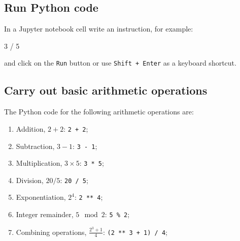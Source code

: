 \subsection{Run Python code}

In a Jupyter notebook cell write an instruction, for example:

\begin{api}
3 / 5
\end{api}


and click on the \texttt{Run} button or use \texttt{Shift + Enter} as a keyboard shortcut.


\subsection{Carry out basic arithmetic operations}
\label{sec:carry_out_basic_arithmetic_operations}

The Python code for the following arithmetic operations are:

\begin{enumerate}

\item 

Addition, \(2 + 2\): \texttt{2 + 2};

\item 

Subtraction, \(3 - 1\): \texttt{3 - 1};

\item 

Multiplication, \(3 \times 5\): \texttt{3 * 5};

\item 

Division, \(20 / 5\): \texttt{20 / 5};

\item 

Exponentiation, \(2 ^ 4\): \texttt{2 ** 4};

\item 

Integer remainder, \(5 \mod 2\): \texttt{5 \% 2};

\item 

Combining operations, \(\frac{2 ^ 3 + 1}{4}\): \texttt{(2 ** 3 + 1) / 4};

\end{enumerate}


